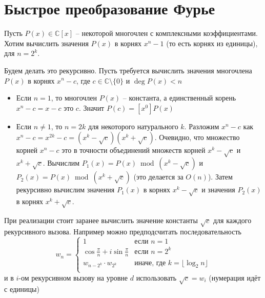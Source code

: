 \section{Быстрое преобразование Фурье}

Пусть $P(x) \in \mathbb{C}[x]$ -- некоторой многочлен с комплексными коэффициентами.
Хотим вычислить значения $P(x)$ в корнях $x^n - 1$ (то есть корнях из единицы), для $n = 2^k$.

Будем делать это рекурсивно. Пусть требуется вычислить значения многочлена $P(x)$ в корнях $x^{n} - c$, где $c \in \mathbb{C} \setminus \{0\}$ и $\deg P(x) < n$
\begin{itemize}
    \item Если $n = 1$, то многочлен $P(x)$ -- константа, а единственный корень $x^n - c = x - c$ это $c$. Значит $P(c) = [x^0]P(x)$
    \item Если $n \neq 1$, то $n = 2k$ для некоторого натурального $k$. Разложим $x^n - c$ как $x^n - c = x^{2k} - c = (x^k - \sqrt{c})(x^k + \sqrt{c})$.
          Очевидно, что множество корней $x^n - c$ это в точности объединений множеств корней $x^k - \sqrt{c}$ и $x^k + \sqrt{c}$.
          Вычислим $P_1(x) = P(x) \bmod (x^k - \sqrt{c})$ и $P_2(x) = P(x) \bmod (x^k + \sqrt{c})$ (это делается за $O(n)$).
          Затем рекурсивно вычислим значения $P_1(x)$ в корнях $x^k - \sqrt{c}$ и значения $P_2(x)$ в корнях $x^k + \sqrt{c}$.
\end{itemize}

При реализации стоит заранее вычислить значение константы $\sqrt{c}$ для каждого рекурсивного вызова.
Например можно предподсчитать последовательность
$$
    w_n = \begin{cases}
        1                                         & \text{если $n = 1$}                              \\
        \cos \frac{\pi}{n} + i \sin \frac{\pi}{n} & \text{если $n = 2^k$}                            \\
        w_{n - 2^k} \cdot w_{2^k}                 & \text{иначе, где $k = \lfloor \log_2 n \rfloor$} \\
    \end{cases}
$$
и в $i$-ом рекурсивном вызову на уровне $d$ использовать $\sqrt{c} = w_i$ (нумерация идёт с единицы)